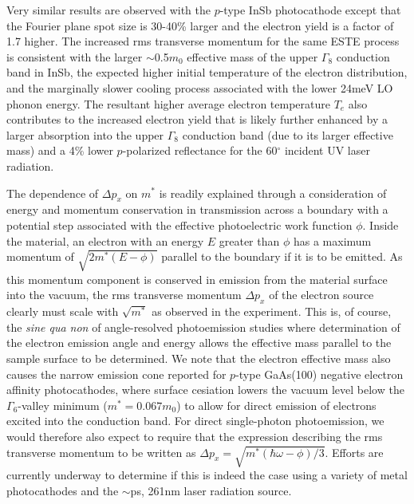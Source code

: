 Very similar results are observed with the $p$-type InSb photocathode except that the Fourier plane spot size is 30-40\%  larger and the electron yield is a factor of 1.7 higher.
The increased rms transverse momentum for the same ESTE process is consistent with the larger $\sim$0.5$m_0$ effective mass of the upper $\Gamma_8$ conduction band in InSb, the expected higher initial temperature of the electron distribution, and the marginally slower cooling process associated with the lower 24meV LO phonon energy.
The resultant higher average electron temperature $T_e$ also contributes to the increased electron yield that is likely further enhanced by a larger absorption into the upper $\Gamma_8$ conduction band (due to its larger effective mass) and a 4\% lower $p$-polarized reflectance for the 60$^{\circ}$ incident UV laser radiation\cite{aspnes_dielectric_1983}. 

The dependence of $\Delta p_x$ on $m^*$ is readily explained through a consideration of energy and momentum conservation in transmission across a boundary with a potential step associated with the effective photoelectric work function $\phi$.
Inside the material, an electron with an energy $E$ greater than $\phi$ has a maximum momentum of $\sqrt{2 m^* (E-\phi) }$ parallel to the boundary if it is to be emitted.
As this momentum component is conserved in emission from the material surface into the vacuum, the rms transverse momentum $\Delta p_x$ of the electron source clearly must scale with $\sqrt{m^*}$ as observed in the experiment.
This is, of course, the \textit{sine qua non} of angle-resolved photoemission studies\cite{himpsel_angle-resolved_1983} where determination of the electron emission angle and energy allows the effective mass parallel to the sample surface to be determined.
We note that the electron effective mass also causes the narrow emission cone reported for $p$-type GaAs(100) negative electron affinity photocathodes\cite{liu_narrow_2005}, where surface cesiation lowers the vacuum level below the $\Gamma_6$-valley minimum ($m^* = 0.067m_0$)  to allow for direct emission of electrons excited into the conduction band.
For direct single-photon photoemission, we would therefore also expect to require that the expression describing the rms transverse momentum to be written as $\Delta p_x = \sqrt{m^* ( \hbar \omega - \phi ) / 3 }$.
Efforts are currently underway to determine if this is indeed the case using a variety of metal photocathodes and the $\sim$ps, 261nm laser radiation source. 
